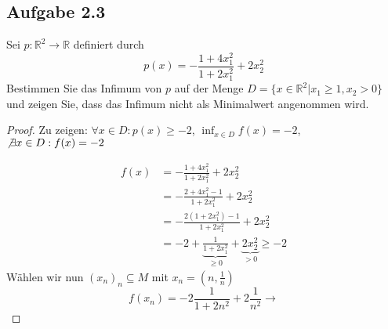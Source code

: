 \documentclass[12pt]{extreport} %
\newcommand{\R}{\mathbb{R}}
\theoremstyle{named}
\theoremstyle{nnamed}
\theoremstyle{itshape}
\theoremstyle{normal}
\begin{document}
\subsection*{Aufgabe 2.3}

Sei $p \colon \R^2 \rightarrow \R$ definiert durch
$$ p(x) = - \frac{1 + 4 x^2_1}{1 + 2 x_1^2} + 2 x_2^2 $$
Bestimmen Sie das Infimum von $p$ auf der Menge $D = \{ x \in \R^2 | x_1 \geq 1, x_2 > 0 \}$ und zeigen Sie, dass das Infimum nicht als Minimalwert angenommen wird.

\begin{proof}
	Zu zeigen: $\forall x \in D: p(x) \geq -2$, $\inf_{x \in D} f(x) = - 2$, $\not\exists x \in D: f(x) = -2$
	
	\begin{align*}
		f(x) & = - \frac{1 + 4x_1^2}{1 + 2x_1^2} + 2 x_2^2 \\
			& = - \frac{2 + 4 x_1^2 - 1}{1 + 2x_1^2	} + 2 x_2^2 \\
			& = - \frac{2 ( 1+ 2 x_1^2) - 1}{1 + 2 x_1^2} + 2x_2^2 \\
			& = - 2 + \underbrace{\frac{1}{1 + 2 x_1^2}}_{\geq 0} + \underbrace{2 x_2^2}_{> 0} \geq -2
	\end{align*}
 	Wählen wir nun $(x_n)_n \subseteq M$ mit $x_n = \left( n , \frac{1}{n} \right)$
 	$$ f(x_n) = - 2  \frac{1}{1 + 2 n ^2} + 2 \frac{1}{n^2} \rightarrow  $$
\end{proof}

\end{document}
